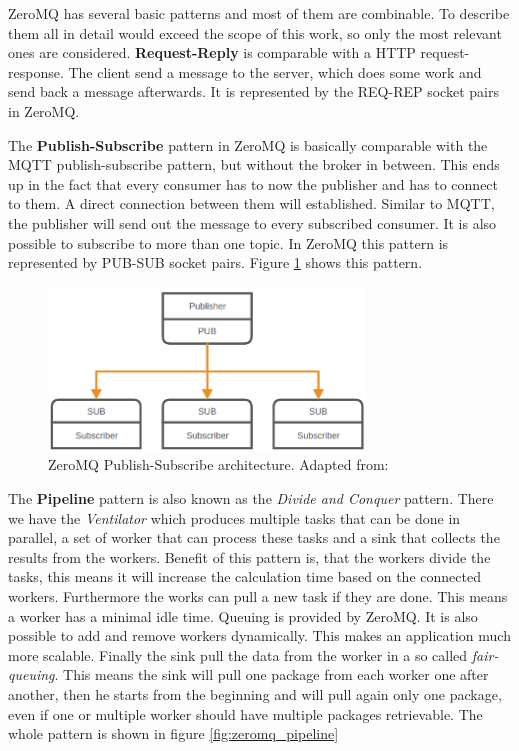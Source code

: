 ZeroMQ has several basic patterns and most of them are combinable.
To describe them all in detail would exceed the scope of this work, so only the most relevant ones are considered.\newline
\textbf{Request-Reply} is comparable with a \ac{HTTP} request-response.
The client send a message to the server, which does some work and send back a message afterwards.
It is represented by the REQ-REP socket pairs in ZeroMQ.\newline

The \textbf{Publish-Subscribe} pattern in ZeroMQ is basically comparable with the MQTT publish-subscribe pattern, but without the broker in between.
This ends up in the fact that every consumer has to now the publisher and has to connect to them.
A direct connection between them will established.
Similar to MQTT, the publisher will send out the message to every subscribed consumer.
It is also possible to subscribe to more than one topic.
In ZeroMQ this pattern is represented by PUB-SUB socket pairs.
Figure \ref{fig:zeromq_pub_sub} shows this pattern.

\begin{figure}[H]
    \centering
    \includegraphics[width=0.75\textwidth]{resources/images/zeromq-pub-sub.png}
    \caption[ZeroMQ Publish-Subscribe architecture]{ZeroMQ Publish-Subscribe architecture. Adapted from: \autocite{ZeroMQ:Guide}}
    \label{fig:zeromq_pub_sub}
\end{figure}

The \textbf{Pipeline} pattern is also known as the \textit{Divide and Conquer} pattern.
There we have the \textit{Ventilator} which produces multiple tasks that can be done in parallel, a set of worker that can process these tasks and a sink that collects the results from the workers.\autocite{ZeroMQ:Guide}
Benefit of this pattern is, that the workers divide the tasks, this means it will increase the calculation time based on the connected workers.
Furthermore the works can pull a new task if they are done.
This means a worker has a minimal idle time.
Queuing is provided by ZeroMQ.
It is also possible to add and remove workers dynamically.
This makes an application much more scalable.
Finally the sink pull the data from the worker in a so called \textit{fair-queuing}.
This means the sink will pull one package from each worker one after another, then he starts from the beginning and will pull again only one package, even if one or multiple worker should have multiple packages retrievable.
The whole pattern is shown in figure \ref{fig:zeromq_pipeline}\newline


